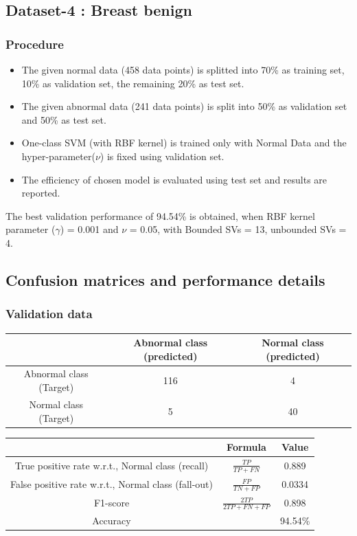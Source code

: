 \documentclass[fleqn]{article}
\begin{document}
\subsection{Dataset-4 : Breast benign}
\subsubsection{Procedure}
\begin{itemize}
  \item The given normal data (458 data points) is splitted into 70\% as training set, 10\% as validation set, the remaining 20\% as test set.
  \item The given abnormal data (241 data points) is split into 50\% as validation set and 50\% as test set.
  \item One-class SVM (with RBF kernel) is trained only with Normal Data and the hyper-parameter($\nu$) is fixed using validation set.
  \item The efficiency of chosen model is evaluated using test set and results are reported.  
\end{itemize}

\newpage
The best validation performance of 94.54\% is obtained, when RBF kernel parameter ($\gamma$) = 0.001 and $\nu$ = 0.05,
with Bounded SVs = 13, unbounded SVs = 4.

\subsection{Confusion matrices and performance details}

\subsubsection{Validation data}

\begin{center}
  \begin{longtable}{ c | c | c  }
	\multicolumn{1}{c}{ } & 
	\multicolumn{1}{c}{Abnormal class (predicted)} & 
	\multicolumn{1}{c}{Normal class (predicted)} \\
    \hline
    Abnormal class (Target)& 116 & 4 \\ \hline
    Normal class (Target)&  5 & 40 \\ \hline
  \end{longtable}
\end{center}    

\begin{center}
  \begin{longtable}{ c | c | c  }
  	\multicolumn{1}{c}{ } & 
	\multicolumn{1}{c}{Formula} & 
	\multicolumn{1}{c}{Value} \\\hline
	True positive rate w.r.t., Normal class (recall)  & $\frac{TP}{TP + FN}$ & 0.889 \\\hline
	False positive rate w.r.t., Normal class (fall-out)  & $\frac{FP}{TN + FP}$ & 0.0334\\\hline
	F1-score & $\frac{2TP}{2TP + FN + FP}$ & 0.898\\\hline
	Accuracy  & & 94.54\%\\\hline
  \end{longtable}
\end{center} 
\end{document}
